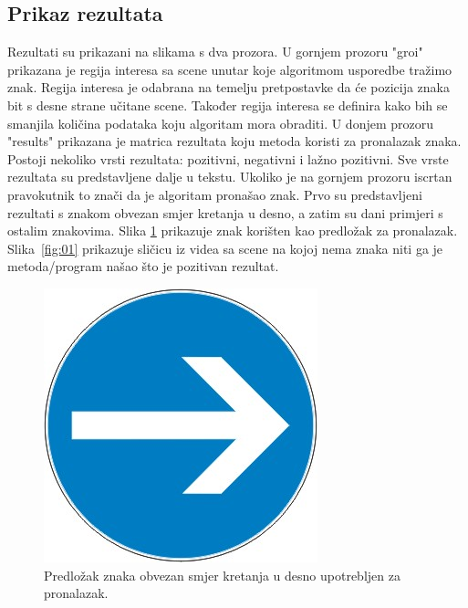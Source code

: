 \newpage
\subsection{Prikaz rezultata} %
\label{sub:Prikaz rezultata}

Rezultati su prikazani na slikama s dva prozora. U gornjem prozoru 
"groi" prikazana je regija interesa sa scene unutar koje algoritmom usporedbe
tražimo znak. Regija interesa je odabrana na temelju pretpostavke da će
pozicija znaka bit s desne strane učitane scene. Također regija interesa
se definira kako bih se smanjila količina podataka koju algoritam mora
obraditi. U donjem prozoru "results" prikazana je matrica rezultata koju metoda
koristi za pronalazak znaka. Postoji nekoliko vrsti rezultata:
pozitivni, negativni i lažno pozitivni. Sve vrste rezultata su
predstavljene dalje u tekstu. Ukoliko je na gornjem prozoru iscrtan 
pravokutnik to znači da je algoritam pronašao znak.
Prvo su predstavljeni rezultati s znakom obvezan smjer kretanja u desno, a 
zatim su dani primjeri s ostalim znakovima.
Slika \ref{fig:00} prikazuje znak korišten kao predložak za pronalazak.
Slika~\ref{fig:01} prikazuje sličicu iz
videa sa scene na kojoj nema znaka niti ga je metoda/program našao što
je pozitivan rezultat.

\begin{figure}[h]
\centering
\includegraphics[scale=0.25]{figures/znak.png}
\caption{Predložak znaka obvezan smjer kretanja u desno upotrebljen za pronalazak.}
\label{fig:00}
\end{figure}

